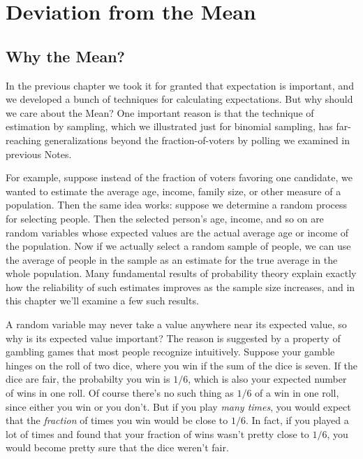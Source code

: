 \chapter{Deviation from the Mean}

\section{Why the Mean?}

In the previous chapter we took it for granted that expectation is
important, and we developed a bunch of techniques for calculating
expectations.  But why should we care about the Mean?  One important
reason is that the technique of estimation by sampling, which we
illustrated just for binomial sampling, has far-reaching generalizations
beyond the fraction-of-voters by polling we examined in previous Notes.

For example, suppose instead of the fraction of voters favoring one
candidate, we wanted to estimate the average age, income, family size, or
other measure of a population.  Then the same idea works: suppose we
determine a random process for selecting people.  Then the selected
person's age, income, and so on are random variables whose expected values
are the actual average age or income of the population.  Now if we
actually select a random sample of people, we can use the average of
people in the sample as an estimate for the true average in the whole
population.  Many fundamental results of probability theory explain
exactly how the reliability of such estimates improves as the sample size
increases, and in this chapter we'll examine a few such results.

A random variable may never take a value anywhere near its expected value,
so why is its expected value important?  The reason is suggested by a
property of gambling games that most people recognize intuitively.
Suppose your gamble hinges on the roll of two dice, where you win if the
sum of the dice is seven.  If the dice are fair, the probabilty you win is
$1/6$, which is also your expected number of wins in one roll.  Of course
there's no such thing as $1/6$ of a win in one roll, since either you win
or you don't.  But if you play \emph{many times}, you would expect that
the \emph{fraction} of times you win would be close to $1/6$.  In fact, if
you played a lot of times and found that your fraction of wins wasn't
pretty close to $1/6$, you would become pretty sure that the dice weren't
fair.

